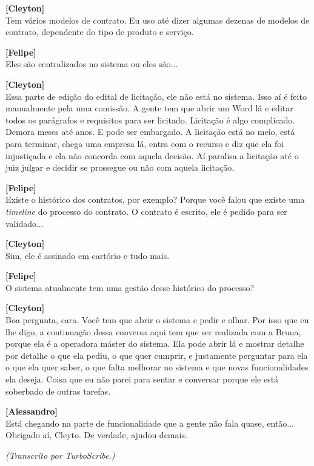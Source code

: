 \documentclass[12pt,a4paper]{article}
\begin{document}
\begin{entrevista}
    \textbf{[Cleyton]} \\
    Tem vários modelos de contrato. Eu uso até dizer algumas dezenas de modelos de contrato, dependente do tipo de produto e serviço.

    \textbf{[Felipe]} \\
    Eles são centralizados no sistema ou eles são...

    \textbf{[Cleyton]} \\
    Essa parte de edição do edital de licitação, ele não está no sistema. Isso aí é feito manualmente pela uma comissão. A gente tem que abrir um Word lá e editar todos os parágrafos e requisitos para ser licitado. Licitação é algo complicado. Demora meses até anos. E pode ser embargado. A licitação está no meio, está para terminar, chega uma empresa lá, entra com o recurso e diz que ela foi injustiçada e ela não concorda com aquela decisão. Aí paralisa a licitação até o juiz julgar e decidir se prossegue ou não com aquela licitação.

    \textbf{[Felipe]} \\
    Existe o histórico dos contratos, por exemplo? Porque você falou que existe uma \textit{timeline} do processo do contrato. O contrato é escrito, ele é pedido para ser validado...

    \textbf{[Cleyton]} \\
    Sim, ele é assinado em cartório e tudo mais.

    \textbf{[Felipe]} \\
    O sistema atualmente tem uma gestão desse histórico do processo?

    \textbf{[Cleyton]} \\
    Boa pergunta, cara. Você tem que abrir o sistema e pedir e olhar. Por isso que eu lhe digo, a continuação dessa conversa aqui tem que ser realizada com a Bruna, porque ela é a operadora máster do sistema. Ela pode abrir lá e mostrar detalhe por detalhe o que ela pediu, o que quer cumprir, e justamente perguntar para ela o que ela quer saber, o que falta melhorar no sistema e que novas funcionalidades ela deseja. Coisa que eu não parei para sentar e conversar porque ele está soberbado de outras tarefas.

    \textbf{[Alessandro]} \\
    Está chegando na parte de funcionalidade que a gente não fala quase, então... Obrigado aí, Cleyto. De verdade, ajudou demais.
\end{entrevista}

{\small\textit{(Transcrito por TurboScribe.)}}
\end{document}

